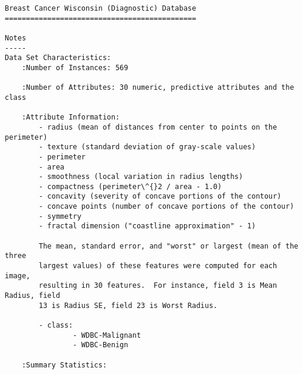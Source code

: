 \documentclass[11pt]{article}
\begin{document}
    \begin{Verbatim}[commandchars=\\\{\}]
Breast Cancer Wisconsin (Diagnostic) Database
=============================================

Notes
-----
Data Set Characteristics:
    :Number of Instances: 569

    :Number of Attributes: 30 numeric, predictive attributes and the class

    :Attribute Information:
        - radius (mean of distances from center to points on the perimeter)
        - texture (standard deviation of gray-scale values)
        - perimeter
        - area
        - smoothness (local variation in radius lengths)
        - compactness (perimeter\^{}2 / area - 1.0)
        - concavity (severity of concave portions of the contour)
        - concave points (number of concave portions of the contour)
        - symmetry 
        - fractal dimension ("coastline approximation" - 1)

        The mean, standard error, and "worst" or largest (mean of the three
        largest values) of these features were computed for each image,
        resulting in 30 features.  For instance, field 3 is Mean Radius, field
        13 is Radius SE, field 23 is Worst Radius.

        - class:
                - WDBC-Malignant
                - WDBC-Benign

    :Summary Statistics:


\end{Verbatim}
\end{document}
